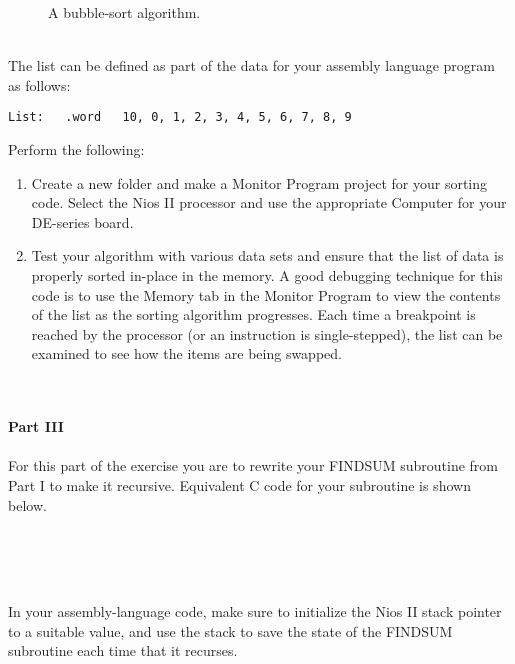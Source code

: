 \documentclass[epsfig,10pt,fullpage]{article}
\begin{document}
\begin{figure}[H]
\begin{center}
\begin{minipage}[t]{16.5 cm}

\end{minipage}
\end{center}
\caption{A bubble-sort algorithm.}
\label{fig:C_code}
\end{figure}

~\\
\noindent
The list can be defined as part of the data for your assembly language program as follows:

\begin{lstlisting}[style=defaultNiosStyle]
List: 	.word 	10, 0, 1, 2, 3, 4, 5, 6, 7, 8, 9
\end{lstlisting}

\noindent
Perform the following:

\begin{enumerate}
\item Create a new folder and make a Monitor Program project for your sorting code. Select
the Nios II processor and use the appropriate Computer for your DE-series board.

\item
Test your algorithm with various data sets and ensure
that the list of data is properly sorted in-place in the memory. A good debugging
technique for this code is to use the Memory tab in the Monitor Program to view the
contents of the list as the sorting algorithm progresses. Each time a breakpoint is reached by
the processor (or an instruction is single-stepped), the list can be examined to see how
the items are being swapped.
\end{enumerate}

~\\
~\\
\noindent
{\bf Part III}
~\\
~\\
For this part of the exercise you are to rewrite your FINDSUM subroutine from Part I to make 
it recursive.  Equivalent C code for your subroutine is shown below.

~\\
\begin{minipage}[h]{16.5 cm}

\end{minipage}

~\\
~\\
\noindent
In your assembly-language code, make sure to initialize the Nios II stack pointer to 
a suitable value, and use the stack to save the state of the FINDSUM subroutine each 
time that it recurses.
\end{document}
